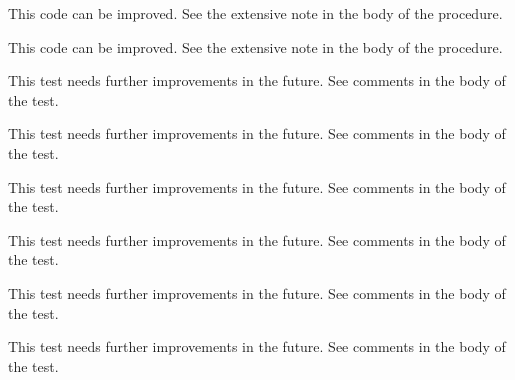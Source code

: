 \begin{DoxyRefList}
%
 This code can be improved. See the extensive note in the body of the procedure.  
\item[Subprogram \mbox{\hyperlink{namespacesystem__mod_abfece8ed7e774b1376409cfdd2198f8c}{system\+\_\+mod\+::copyfile}} (path\+Old, path\+New, is\+Unix\+Shell, Err)]\label{todo__todo000014}%
%
 This code can be improved. See the extensive note in the body of the procedure.  
\item[Subprogram \mbox{\hyperlink{namespacetest__system__mod_a40668a840b8eb874b50a3325a042ea25}{test\+\_\+system\+\_\+mod\+::test\+\_\+envvar\+\_\+type\+\_\+2}} ()]\label{todo__todo000019}%
%
 This test needs further improvements in the future. See comments in the body of the test.  
\item[Subprogram \mbox{\hyperlink{namespacetest__system__mod_ae31ca43945c2bb5390181c30e74435af}{test\+\_\+system\+\_\+mod\+::test\+\_\+envvar\+\_\+type\+\_\+3}} ()]\label{todo__todo000020}%
%
 This test needs further improvements in the future. See comments in the body of the test.  
\item[Subprogram \mbox{\hyperlink{namespacetest__system__mod_a77fdc1060526949311477aa365dfb501}{test\+\_\+system\+\_\+mod\+::test\+\_\+cmdarg\+\_\+type\+\_\+1}} ()]\label{todo__todo000021}%
%
 This test needs further improvements in the future. See comments in the body of the test.  
\item[Subprogram \mbox{\hyperlink{namespacetest__system__mod_a80b5f80b4c4a2e4034b2a9b0c5e7b888}{test\+\_\+system\+\_\+mod\+::test\+\_\+os\+\_\+type\+\_\+1}} ()]\label{todo__todo000022}%
%
 This test needs further improvements in the future. See comments in the body of the test.  
\item[Subprogram \mbox{\hyperlink{namespacetest__system__mod_a38ed98af363dec1279b079570c24105b}{test\+\_\+system\+\_\+mod\+::test\+\_\+os\+\_\+type\+\_\+2}} ()]\label{todo__todo000023}%
%
 This test needs further improvements in the future. See comments in the body of the test.  
\item[Subprogram \mbox{\hyperlink{namespacetest__system__mod_a4fdd1321521a11347b42f80bb85189af}{test\+\_\+system\+\_\+mod\+::test\+\_\+os\+\_\+type\+\_\+3}} ()]\label{todo__todo000024}%
%
 This test needs further improvements in the future. See comments in the body of the test.  
\item[Subprogram \mbox{\hyperlink{namespacetest__system__mod_a231fa64534d810b5e8e1c96e77e7e254}{test\+\_\+system\+\_\+mod\+::test\+\_\+syscmd\+\_\+type\+\_\+1}} ()]\label{todo__todo000025}%

\end{DoxyRefList}
